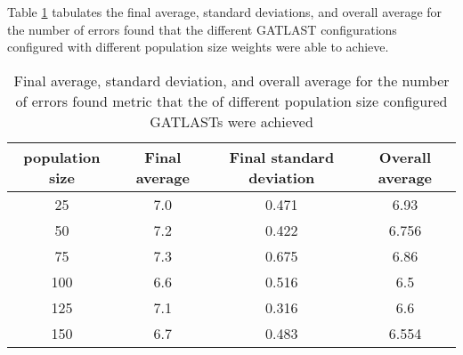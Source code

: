 Table \ref{tab:HP:GA:populationSize:number of errors found} tabulates the final average, standard deviations, and overall average for the number of errors found that the different GATLAST configurations configured with different population size weights were able to achieve.
\begin{table}[tbh!]
\centering
\begin{adjustbox}{trim=0cm 0cm 0cm 0cm, clip=true}
\begin{tabular}{|c|c|c|c|}
\hline
population size & Final average & Final standard deviation & Overall average\\
\hline
25 & 7.0 & 0.471 & 6.93\\\hline
50 & 7.2 & 0.422 & 6.756\\\hline
75 & 7.3 & 0.675 & 6.86\\\hline
100 & 6.6 & 0.516 & 6.5\\\hline
125 & 7.1 & 0.316 & 6.6\\\hline
150 & 6.7 & 0.483 & 6.554\\\hline
\end{tabular}
\end{adjustbox}
\caption{Final average, standard deviation, and overall average for the number of errors found metric that the of different population size configured GATLASTs were achieved}
\label{tab:HP:GA:populationSize:number of errors found}
\end{table}